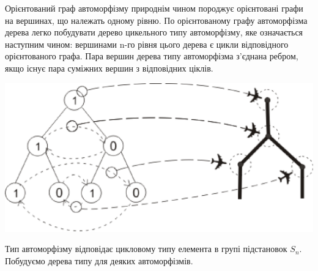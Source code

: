 \documentclass[a4paper,12pt]{article} \usepackage{a4wide}
\numberwithin{equation}{subsection}
\begin{document}
 Орієнтований граф автоморфізму природнім чином породжує орієнтовані графи на вершинах, що належать одному рівню.
По орієнтованому графу автоморфізма дерева легко побудувати дерево цикельного типу автоморфізму, яке означається наступним чином: вершинами n-го рівня цього дерева є цикли відповідного орієнтованого графа. Пара вершин дерева типу автоморфізма з'єднана ребром, якщо існує пара суміжних вершин з відповідних ціклів.
\begin{center}
\includegraphics[scale=0.9]{Type_tree1.eps}
\end{center}

Тип автоморфізму відповідає цикловому типу елемента в групі підстановок $S_n$. Побудуємо дерева типу для деяких автоморфізмів.
\end{document}
